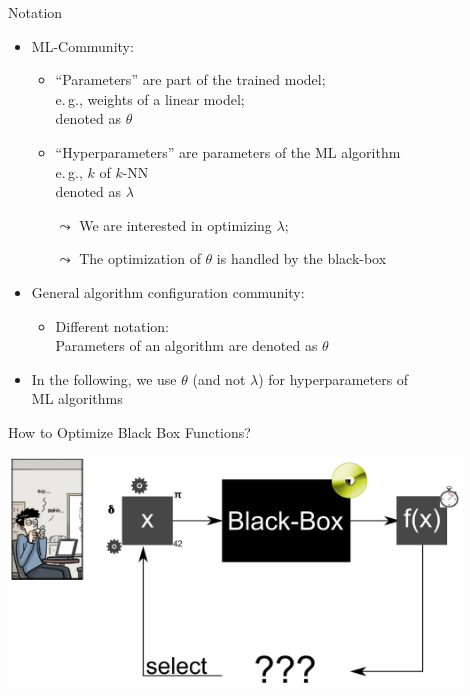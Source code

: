 \begin{frame}[c]{Notation}

\begin{itemize}
  \item ML-Community: 
  \begin{itemize}
    \item ``Parameters'' are part of the trained model;\\
    	  e.$\,$g., weights of a linear model;\\
    	  denoted as $\theta$
    \item ``Hyperparameters'' are parameters of the ML algorithm\\
    		e.$\,$g., $k$ of $k$-NN\\
    		denoted as $\lambda$
    \item[$\leadsto$] We are interested in optimizing $\lambda$;\\
    \item[$\leadsto$] The optimization of $\theta$ is handled by the black-box     			 
  \end{itemize}
  \pause
  \item General algorithm configuration community:
  \begin{itemize}
    \item Different notation:\\
     	  Parameters of an algorithm are denoted as $\theta$
  \end{itemize}
  \pause
  \item \alert{In the following, we use $\theta$ (and not $\lambda$) for hyperparameters of\\ ML algorithms}
\end{itemize}

\end{frame}
\begin{frame}[c]{How to Optimize Black Box Functions?}

\centering
\includegraphics[width=0.9\textwidth]{images/black_box_aut_opt.png}

\end{frame}
